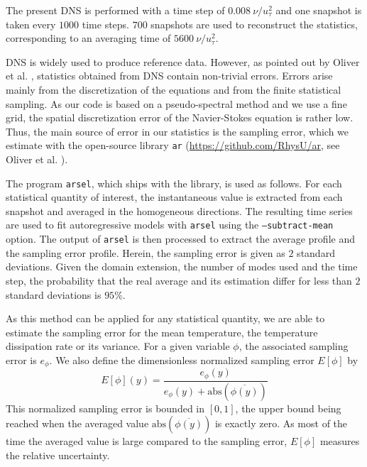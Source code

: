 \documentclass[review]{elsarticle}
\begin{document}
The present DNS is performed with a time step of $0.008 ~ \nu / u_\tau^2$ and one snapshot is taken every $\num{1 000}$ time steps. $700$ snapshots are used to reconstruct the statistics, corresponding to an averaging time of $\num{5 600} ~ \nu / u_\tau^2$.

DNS is widely used to produce reference data. However, as pointed out by Oliver et al. \cite{oliver2014estimating}, statistics obtained from DNS contain non-trivial errors. Errors arise mainly from the discretization of the equations and from the finite statistical sampling. As our code is based on a pseudo-spectral method and we use a fine grid, the spatial discretization error of the Navier-Stokes equation is rather low. Thus, the main source of error in our statistics is the sampling error, which we estimate with the open-source library \texttt{ar} (\url{https://github.com/RhysU/ar}, see Oliver et al. \cite{oliver2014estimating}).

The program \texttt{arsel}, which ships with the library, is used as follows. For each statistical quantity of interest, the instantaneous value is extracted from each snapshot and averaged in the homogeneous directions. The resulting time series are used to fit autoregressive models with \texttt{arsel} using the \texttt{--subtract-mean} option. The output of \texttt{arsel} is then processed to extract the average profile and the sampling error profile. Herein, the sampling error is given as $2$ standard deviations. Given the domain extension, the number of modes used and the time step, the probability that the real average and its estimation differ for less than $2$ standard deviations is $95\%$.

As this method can be applied for any statistical quantity, we are able to estimate the sampling error for the mean temperature, the temperature dissipation rate or its variance. For a given variable $\phi$, the associated sampling error is $e_\phi$. We also define the dimensionless normalized sampling error $E\left[\phi\right]$ by
\begin{equation}
E\left[\phi\right]\left(y\right) = \frac{e_\phi \left(y\right)}{e_\phi \left(y\right) + \mbox{abs}\left( \overline{\phi \left(y\right)} \right)}
\end{equation}
This normalized sampling error is bounded in $[0,1]$, the upper bound being reached when the averaged value $\mbox{abs}\left( \overline{\phi \left(y\right)} \right)$ is exactly zero. As most of the time the averaged value is large compared to the sampling error, $E\left[\phi\right]$ measures the relative uncertainty.
\end{document}
